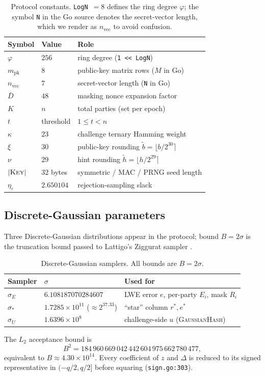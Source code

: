 \begin{table}[H]
\centering
\caption{Protocol constants. \texttt{LogN}~$=8$ defines the ring degree $\varphi$; the symbol \texttt{N} in the Go source denotes the secret-vector length, which we render as $n_{\textrm{vec}}$ to avoid confusion.}
\label{tab:constants}
\begin{tabular}{llp{6.5cm}}
\toprule
Symbol & Value & Role \\
\midrule
$\varphi$           & $256$         & ring degree (\texttt{1 << LogN}) \\
$m_{\textrm{pk}}$   & $8$           & public-key matrix rows ($M$ in Go) \\
$n_{\textrm{vec}}$  & $7$           & secret-vector length (\texttt{N} in Go) \\
$\bar D$            & $48$          & masking nonce expansion factor \\
$K$                 & $n$           & total parties (set per epoch) \\
$t$                 & threshold     & $1 \le t < n$ \\
$\kappa$            & $23$          & challenge ternary Hamming weight \\
$\xi$               & $30$          & public-key rounding $\tilde b = \lfloor b / 2^{30} \rceil$ \\
$\nu$               & $29$          & hint rounding $\tilde h = \lfloor h / 2^{29} \rceil$ \\
$|\textsc{Key}|$    & $32$ bytes    & symmetric / MAC / PRNG seed length \\
$\eta_\varepsilon$  & $2.650104$    & rejection-sampling slack \\
\bottomrule
\end{tabular}
\end{table}

\subsection{Discrete-Gaussian parameters}

Three Discrete-Gaussian distributions appear in the protocol; bound $B = 2\sigma$ is the truncation bound passed to Lattigo's Ziggurat sampler \cite{ziggurat,lattigov7}.

\begin{table}[H]
\centering
\caption{Discrete-Gaussian samplers. All bounds are $B = 2\sigma$.}
\begin{tabular}{lll}
\toprule
Sampler & $\sigma$ & Used for \\
\midrule
$\sigma_E$    & $6.108187070284607$                        & LWE error $e$, per-party $E_i$, mask $R_i$ \\
$\sigma_*$    & $1.7285 \times 10^{11}$ ($\approx 2^{37.33}$) & ``star'' column $r^*, e^*$ \\
$\sigma_U$    & $1.6396 \times 10^{8}$                       & challenge-side $u$ (\textsc{GaussianHash}) \\
\bottomrule
\end{tabular}
\end{table}

The $L_2$ acceptance bound is
\[
B^2 = 184\,960\,669\,042\,442\,604\,975\,662\,780\,477,
\]
equivalent to $B \approx 4.30 \times 10^{14}$. Every coefficient of $z$ and $\Delta$ is reduced to its signed representative in $(-q/2, q/2]$ before squaring (\texttt{sign.go:303}).

